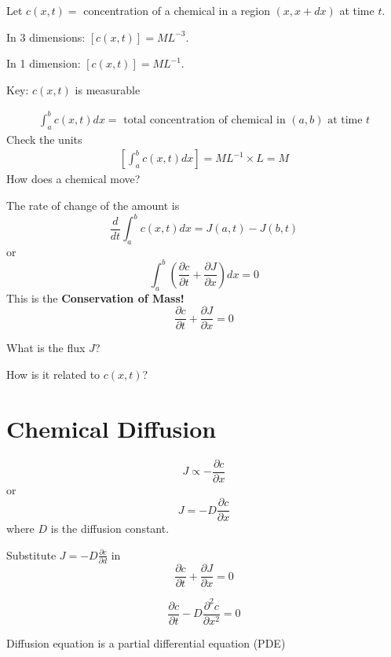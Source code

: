 \documentclass[
	date={September 4{,} 2024}
]{math486notes}
\begin{document}
Let $c(x,t) = $ concentration of a chemical in a region $(x, x+dx)$ at time $t$.

In 3 dimensions: $[c(x,t)] = ML^{-3}$.

In 1 dimension: $[c(x,t)] = ML^{-1}$.

Key: $c(x,t)$ is measurable

\begin{equation*}
\begin{aligned}
	\int_{a}^{b} c(x,t)dx = \mbox{ total concentration of chemical in } (a, b) \mbox{ at time }t
\end{aligned}
\end{equation*}
Check the units
\begin{equation*}
\begin{aligned}
	\left[ \int_{a}^{b} c(x,t)dx \right] = ML^{-1}\times L = M
\end{aligned}
\end{equation*}
How does a chemical move?

The rate of change of the amount is
\[ \frac{d}{dt}\int_{a}^{b} c(x,t)dx = J(a,t) - J(b,t) \]
or
\[ \int_{a}^{b} \left( \frac{\partial c}{\partial t} + \frac{\partial J}{\partial x} \right)dx = 0 \]
This is the \textbf{Conservation of Mass!}
\[ \frac{\partial c}{\partial t} + \frac{\partial J}{\partial x} = 0 \]

What is the flux $J$?

How is it related to $c(x,t)$?

\section{Chemical Diffusion}\label{sec:chemical-diffusion}
\[ J \propto -\frac{\partial c}{\partial x} \]
or
\[ J = -D\frac{\partial c}{\partial x} \]
where $D$ is the diffusion constant.

Substitute $J=-D\frac{\partial c}{\partial d}$ in
\[ \frac{\partial c}{\partial t} + \frac{\partial J}{\partial x} = 0 \]

\begin{equation}
	\frac{\partial c}{\partial t} - D\frac{\partial^{2} c}{\partial x^{2}} = 0
	\label{eq:diffusion}
\end{equation}

Diffusion equation is a partial differential equation (PDE)
\end{document}

